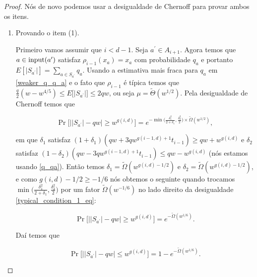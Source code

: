 \begin{proof}

Nós de novo podemos usar a desigualdade de Chernoff para provar ambos os itens.

\begin{enumerate}

	\item Provando o item (1).

	Primeiro vamos assumir que $i < d  -1$. Seja $a^{\prime} \in A_{i + 1}$. Agora temos que $a \in \text{input}(a^{\prime})$ satisfaz $\rho_{i - 1}(x_{a}) = x_{a}$ com probabilidade $q_{a}$ e portanto $E[\lvert S_{a^{\prime}} \rvert] = \sum_{a \in S_{a^{\prime}}} q_{a}$. Usando a estimativa mais fraca para $q_{a}$ em \ref{weaker_q_q_a} e o fato que $\rho_{i - 1}$ é típica temos que $\frac{q}{2}(w - w^{4/5}) \leq E\big[ \lvert S_{a^{\prime}} \rvert \big] \leq 2qw$, ou seja $\mu = \widetilde{\Theta}(w^{1/2})$. Pela desigualdade de Chernoff temos que
	
	\begin{equation} \label{typical_condition_1_eq}
		\Pr\Big[ \big\lvert \lvert S_{a^{\prime}} \rvert - qw \big\rvert \geq w^{g(i, d)} \Big] = e^{- \min\big( \frac{\delta_{1}^{2}}{2 + \delta_{1}}, \frac{\delta_{2}^{2}}{2} \big) \times \widetilde{\Omega}(w^{1/2})},
	\end{equation}
	
	em que $\delta_{1}$ satisfaz $(1 + \delta_{1})(qw + 3qw^{g(i - 1, d) + 1}t_{i - 1}) \geq qw + w^{g(i, d)}$ e $\delta_{2}$ satisfaz $(1 - \delta_{2})(qw - 3qw^{g(i - 1, d) + 1}t_{i - 1}) \leq qw - w^{g(i, d)}$ (nós estamos usando \ref{q_qa}). Então temos $\delta_{1} = \widetilde{\Omega}(w^{g(i, d) - 1/2})$ e $\delta_{2} = \widetilde{\Omega}(w^{g(i, d) - 1/2})$, e como $g(i, d) - 1/2 \geq -1/6$ nós obtemos o seguinte quando trocamos $\min \big(\frac{\delta_{1}^{2}}{2 + \delta_{1}}, \frac{\delta_{2}^{2}}{2} \big)$ por um fator $\widetilde{\Omega}(w^{-1/6})$ no lado direito da desigualdade \ref{typical_condition_1_eq}:

	\begin{equation*}
		  \Pr\Big[ \big\lvert \lvert S_{a^{\prime}} \rvert - qw \big\rvert \geq w^{g(i, d)} \Big] = e^{-\widetilde{\Omega}(w^{1/6})}.
	\end{equation*}

	Daí temos que

	\begin{equation*}
		\Pr \Big[ \big\lvert \lvert S_{a^{\prime}} \rvert - qw \big\rvert \leq w^{g(i, d)} \Big] = 1 - e^{-\widetilde{\Omega}(w^{1/6})}.
	\end{equation*}


\end{enumerate}
\end{proof}
